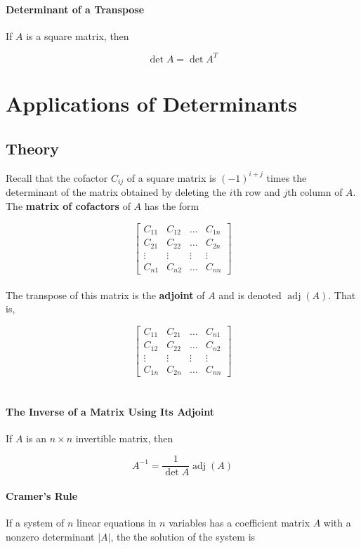 \documentclass{report}
\begin{document}
\paragraph{Determinant of a Transpose} If $A$ is a square matrix, then

$$
\det{A} = \det{A^T}
$$

\section{Applications of Determinants}

\subsection{Theory}

Recall that the cofactor $C_{ij}$ of a square matrix is $(-1)^{i+j}$ times the determinant of the matrix obtained by deleting the $i$th row and $j$th column of $A$. The \textbf{matrix of cofactors} of $A$ has the form

$$
\begin{bmatrix}
    C_{11} & C_{12} & \hdots & C_{1n} \\
    C_{21} & C_{22} & \hdots & C_{2n} \\
    \vdots & \vdots & \vdots & \vdots \\
    C_{n1} & C_{n2} & \hdots & C_{nn}
\end{bmatrix}
$$\\

\noindent The transpose of this matrix is the \textbf{adjoint} of $A$ and is denoted $\operatorname{adj}{\left(A\right)}$. That is,

$$
\begin{bmatrix}
    C_{11} & C_{21} & \hdots & C_{n1} \\
    C_{12} & C_{22} & \hdots & C_{n2} \\
    \vdots & \vdots & \vdots & \vdots \\
    C_{1n} & C_{2n} & \hdots & C_{nn}
\end{bmatrix}
$$\\

\paragraph{The Inverse of a Matrix Using Its Adjoint} If $A$ is an $n \times n$ invertible matrix, then 

$$A^{-1} = \frac{1}{\det{A}} \operatorname{adj}{(A)}$$

\paragraph{Cramer's Rule} If a system of $n$ linear equations in $n$ variables has a coefficient matrix $A$ with a nonzero determinant $|A|$, the the solution of the system is
\end{document}
